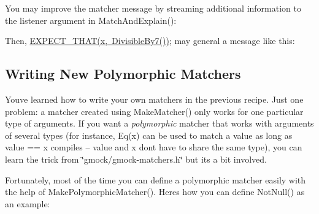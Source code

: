 You may improve the matcher message by streaming additional information to the {\ttfamily listener} argument in {\ttfamily Match\+And\+Explain()}\+:


\begin{DoxyCode}{0}
\DoxyCodeLine{    \}}
\DoxyCodeLine{  \}}
\DoxyCodeLine{\};}
\end{DoxyCode}


Then, {\ttfamily \mbox{\hyperlink{_obj__test_2lib_2googletest-release-1_88_81_2googlemock_2include_2gmock_2gmock-matchers_8h_ac31e206123aa702e1152bb2735b31409}{E\+X\+P\+E\+C\+T\+\_\+\+T\+H\+A\+T(x, Divisible\+By7())}};} may general a message like this\+: 
\begin{DoxyCode}{0}
\end{DoxyCode}


\subsection*{Writing New Polymorphic Matchers}

You\textquotesingle{}ve learned how to write your own matchers in the previous recipe. Just one problem\+: a matcher created using {\ttfamily Make\+Matcher()} only works for one particular type of arguments. If you want a {\itshape polymorphic} matcher that works with arguments of several types (for instance, {\ttfamily Eq(x)} can be used to match a {\ttfamily value} as long as {\ttfamily value} == {\ttfamily x} compiles -- {\ttfamily value} and {\ttfamily x} don\textquotesingle{}t have to share the same type), you can learn the trick from {\ttfamily \char`\"{}gmock/gmock-\/matchers.\+h\char`\"{}} but it\textquotesingle{}s a bit involved.

Fortunately, most of the time you can define a polymorphic matcher easily with the help of {\ttfamily Make\+Polymorphic\+Matcher()}. Here\textquotesingle{}s how you can define {\ttfamily Not\+Null()} as an example\+:


